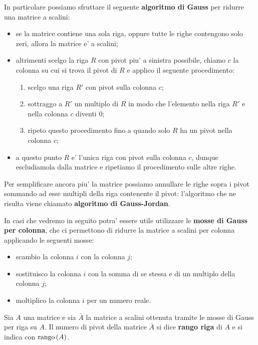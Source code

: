 In particolare possiamo sfruttare il seguente \textbf{algoritmo di Gauss} per ridurre una matrice a scalini:
\begin{itemize}
    \item se la matrice contiene una sola riga, oppure tutte le righe contengono solo zeri, allora la matrice e' a scalini;
    \item altrimenti scelgo la riga $R$ con pivot piu' a sinistra possibile, chiamo $c$ la colonna su cui si trova il pivot di $R$ e applico il seguente procedimento: \begin{enumerate}
        \item scelgo una riga $R'$ con pivot sulla colonna $c$;
        \item sottraggo a $R'$ un multiplo di $R$ in modo che l'elemento nella riga $R'$ e nella colonna $c$ diventi $0$;
        \item ripeto questo procedimento fino a quando solo $R$ ha un pivot nella colonna $c$; 
    \end{enumerate}
    \item a questo punto $R$ e' l'unica riga con pivot sulla colonna $c$, dunque escludiamola dalla matrice e ripetiamo il procedimento sulle altre righe.
\end{itemize}

Per semplificare ancora piu' la matrice possiamo annullare le righe sopra i pivot sommando ad esse multipli della riga contenente il pivot: l'algoritmo che ne risulta viene chiamato \textbf{algoritmo di Gauss-Jordan}.

In casi che vedremo in seguito potra' essere utile utilizzare le \textbf{mosse di Gauss per colonna}, che ci permettono di ridurre la matrice a scalini per colonna applicando le seguenti mosse:
\begin{itemize}
    \item scambio la colonna $i$ con la colonna $j$;
    \item sostituisco la colonna $i$ con la somma di se stessa e di un multiplo della colonna $j$;
    \item moltiplico la colonna $i$ per un numero reale. 
\end{itemize}

\begin{definition}[Rango]
    Sia $A$ una matrice e sia $\bar{A}$ la matrice a scalini ottenuta tramite le mosse di Gauss per riga su $A$. Il numero di pivot della matrice $\bar{A}$ si dice \textbf{rango riga} di $A$ e si indica con $\operatorname{rango}\left( A \right)$.
\end{definition}

